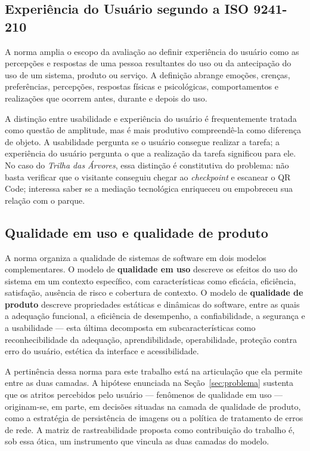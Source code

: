\subsection{Experiência do Usuário segundo a ISO 9241-210}

A norma  amplia o escopo da avaliação ao definir
experiência do usuário como as percepções e respostas de uma pessoa resultantes
do uso ou da antecipação do uso de um sistema, produto ou serviço. A definição
abrange emoções, crenças, preferências, percepções, respostas físicas e
psicológicas, comportamentos e realizações que ocorrem antes, durante e depois do
uso.

A distinção entre usabilidade e experiência do usuário é frequentemente tratada
como questão de amplitude, mas é mais produtivo compreendê-la como diferença de
objeto. A usabilidade pergunta se o usuário consegue realizar a tarefa; a
experiência do usuário pergunta o que a realização da tarefa significou para ele.
No caso do \textit{Trilha das Árvores}, essa distinção é constitutiva do problema:
não basta verificar que o visitante conseguiu chegar ao \textit{checkpoint} e
escanear o QR Code; interessa saber se a mediação tecnológica enriqueceu ou
empobreceu sua relação com o parque.

\subsection{Qualidade em uso e qualidade de produto}

A norma  organiza a qualidade de sistemas de software em
dois modelos complementares. O modelo de \textbf{qualidade em uso} descreve os
efeitos do uso do sistema em um contexto específico, com características como
eficácia, eficiência, satisfação, ausência de risco e cobertura de contexto. O
modelo de \textbf{qualidade de produto} descreve propriedades estáticas e
dinâmicas do software, entre as quais a adequação funcional, a eficiência de
desempenho, a confiabilidade, a segurança e a usabilidade --- esta última
decomposta em subcaracterísticas como reconhecibilidade da adequação,
aprendibilidade, operabilidade, proteção contra erro do usuário, estética da
interface e acessibilidade.

A pertinência dessa norma para este trabalho está na articulação que ela permite
entre as duas camadas. A hipótese enunciada na Seção~\ref{sec:problema} sustenta
que os atritos percebidos pelo usuário --- fenômenos de qualidade em uso ---
originam-se, em parte, em decisões situadas na camada de qualidade de produto,
como a estratégia de persistência de imagens ou a política de tratamento de erros
de rede. A matriz de rastreabilidade proposta como contribuição do trabalho é,
sob essa ótica, um instrumento que vincula as duas camadas do modelo.

